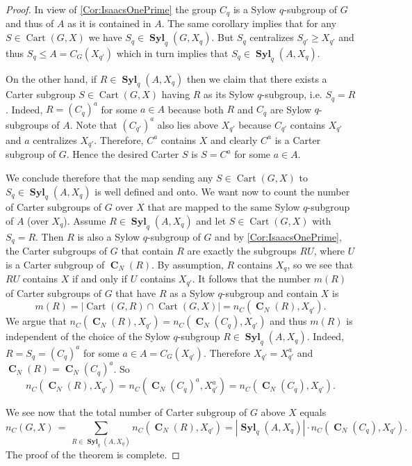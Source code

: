 \documentclass[10pt,a4paper]{amsart}
\numberwithin{equation}{section}
\DeclareMathOperator{\cart}{Cart}
\DeclareMathOperator{\cent}{\mathbf{C}}
\DeclareMathOperator{\syl}{\mathbf{Syl}}
\newcommand{\card}[1]{\left\lvert{#1}\right\rvert}
\renewcommand{\leq}{\leqslant}
\renewcommand{\geq}{\geqslant}
\begin{document}
\begin{proof}
In view of \autoref{Cor:IsaacsOnePrime} the group  $C_q$ is a Sylow $q$-subgroup of $G$ and thus of $A$ as it is contained in $A$. The same corollary implies that  for any  $S \in \cart(G, X)$ we have $S_q \in \syl_q(G, X_q)$. But $S_q$ centralizes $S_{q'} \geq X_{q'}$ and thus $S_q \leq A= C_G(X_{q'})$ which in turn implies that $S_q  \in  \syl_q(A, X_q)$. 

 On the other hand, if $R \in \syl_q(A, X_q)$ then we claim that there exists a Carter subgroup $S \in \cart(G,X)$ having $R$ as its Sylow $q$-subgroup, i.e. $S_q=R$. Indeed, $R = (C_q)^a$ for some $a \in A$ because both $R$ and $C_q$ are Sylow $q$-subgroups of $A$. Note that $(C_{q'})^a$ also lies above $X_{q'}$ because $C_{q'}$ contains $X_{q'}$ and $a$ centralizes $X_{q'}$. Therefore, $C^a$ contains $X$ and clearly $C^a$ is a Carter subgroup of $G$. 
 Hence the desired Carter $S$ is $S= C^a$ for some $a \in A$.

We conclude therefore that the map sending any $S \in \cart(G, X)$ to  $S_q \in \syl_q(A, X_q)$ is well defined and  onto. We want now to count the number of  Carter subgroups of $G$ over $X$ that are  mapped to the same Sylow $q$-subgroup  of $A$ (over $X_q$). Assume $R \in \syl_q(A, X_q)$ and let $S \in \cart(G, X)$ with $S_q=R$. 
Then $R $ is also a Sylow $q$-subgroup of $G$ and 
by  \autoref{Cor:IsaacsOnePrime}, the Carter subgroups of $G$ that contain  $R$  are exactly
the subgroups $R U$, where $U$ is a Carter subgroup of $\cent_N(R)$. By
	assumption, $R$ contains $X_{q}$, so we see that $RU$ contains $X$ if
	and only if $U$ contains $X_{q'}$. It follows that the number $m(R)$ of Carter subgroups of $G$ that have  $R$ as a Sylow $q$-subgroup and  contain $X$ is
	\[
	m(R) = \card{\cart(G, R) \cap \cart(G, X)} =  n_C(\cent_N(R), X_{q'}).
	\]
	We argue that $n_C(\cent_N(R), X_{q'})=n_C(\cent_N(C_{q}), X_{q'})$ 
	and thus $m(R)$  is independent of the choice of the Sylow $q$-subgroup  $R \in  \syl_q(A, X_{q})$. 
	  Indeed, $R= S_q= (C_q)^a$  for some $a \in A= C_G(X_{q'})$. Therefore $X_{q'} = X_{q'}^a$ and $\cent_N(R)= \cent_N(C_q)^a$. So  
	\[
	n_C(\cent_N(R), X_{q'}) = n_C(\cent_N(C_{q})^a, X_{q'}^a)= 
	n_C(\cent_N(C_{q}), X_{q'}).
	\]

We see now that the total number of Carter subgroup of $G$ above $X$ equals 
\[
n_C(G,X) \, = \, \sum_{R \in \syl_{q}(A, X_{q})} n_C(\cent_N(R), X_{q'})= 
|\syl_q(A, X_q) | \cdot n_C(\cent_N(C_{q}), X_{q'}).
\]
The proof of the theorem is complete.
\end{proof}
\end{document}
